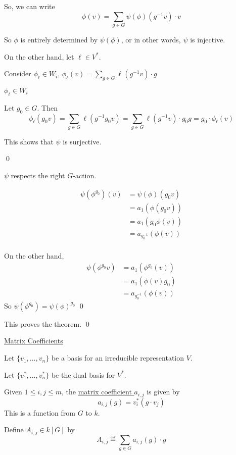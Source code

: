 \documentclass[x11names,reqno,14pt]{extarticle}
\begin{document}
So, we can write
\[
\phi(v) = \sum_{g\in G}\psi(\phi)(g^{-1}v)\cdot v
\]
 
So $\phi$ is entirely determined by $\psi(\phi)$, or in other words, $\psi$ is injective.

On the other hand, let $\ell \in V^*$. 

Consider $\phi_\ell \in W_i$, $\phi_\ell(v) = \sum_{g\in G}\ell(g^{-1}v)\cdot g$

\claim

$\phi_\ell \in W_i$

\proof

Let $g_0 \in G$. Then 
\[
\phi_\ell(g_0v) = \sum_{g\in G}\ell(g^{-1}g_0v) = \sum_{g\in G}\ell(g^{-1}v)\cdot g_0g = g_0\cdot\phi_\ell(v)
\]

This shows that $\psi$ is surjective.

\qed

\claim

$\psi$ respects the right $G$-action. 

\proof

\begin{align*}
\psi(\phi^{g_0})(v) & = \psi(\phi)(g_0v) \\
& = a_1(\phi(g_0v))\\
& = a_1(g_0\phi(v)) \\
& = a_{g_0^{-1}}(\phi(v)) \\
\end{align*}

On the other hand, 
\begin{align*}
\psi(\phi^{g_0}v) & = a_1(\phi^{g_0}(v)) \\
& = a_1(\phi(v)g_0) \\
& = a_{g_0^{-1}}(\phi(v))
\end{align*}
So $\psi(\phi^{g_0}) = \psi(\phi)^{g_0}$
\qed

This proves the theorem. 
\qed

\underline{Matrix Coefficients}

Let $\{v_1, \dots, v_n\}$ be a basis for an irreducible representation $V$. 

Let $\{v_1^*, \dots, v_n^*\}$ be the dual basis for $V^*$.


Given $1 \leq i, j \leq m$, the \underline{matrix coefficient $a_{i,j}$} is given by 
\[
a_{i,j}(g) = v_i^*(g\cdot v_j)
\]
This is a function from $G$ to $k$. 

Define $A_{i,j} \in k[G]$ by 
\[
A_{i,j}\eqdef \sum_{g\in G}a_{i,j}(g)\cdot g 
\]
\end{document}
